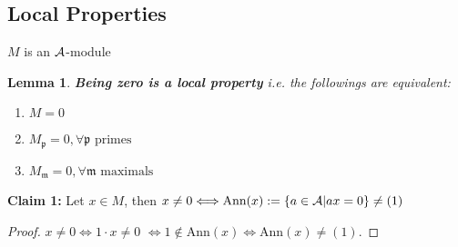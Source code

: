 \documentclass[11pt]{article}
\newtheorem{lemma}[thm]{Lemma}
\newcommand{\scm}{{\mathfrak m}}
\newcommand{\scp}{{\mathfrak p}}
\newcommand{\cala}{{\cal A}}
\newcommand{\Llrta}{\Longleftrightarrow}
\begin{document}
\subsection*{Local Properties}
$M$ is an $\cala$-module
\begin{lemma}\label{lem:zerpo_local}
\textbf{Being zero is a local property} i.e. the followings are equivalent:
\begin{enumerate}[label=(\alph*)]
\item $M=0$
\item $M_\scp=0,\forall \scp \text{ primes }$
\item $M_\scm=0,\forall \scm \text{ maximals}$
\end{enumerate}
\end{lemma}
\noindent\textbf{Claim 1:}
Let $x\in M$, then $x\neq 0\Longleftrightarrow \text{Ann}(x):=\{a\in\cala|ax=0\}\neq (1)$
\begin{proof}
$x\neq 0\Llrta 1\cdot x\neq 0$ $\Llrta 1\notin \text{Ann}(x)\Llrta \text{Ann}(x)\neq (1)$.
\end{proof}
\end{document}
